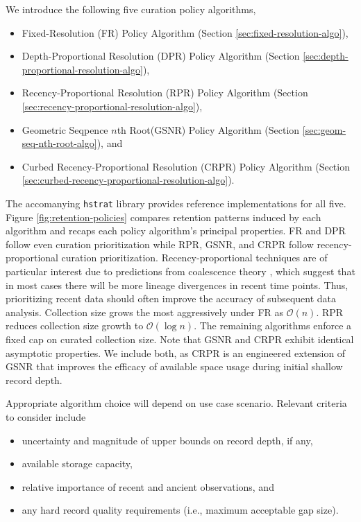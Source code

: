 We introduce the following five curation policy algorithms,
\begin{itemize}
\item Fixed-Resolution (FR) Policy Algorithm (Section \ref{sec:fixed-resolution-algo}),
\item Depth-Proportional Resolution (DPR) Policy Algorithm (Section \ref{sec:depth-proportional-resolution-algo}),
\item Recency-Proportional Resolution (RPR) Policy Algorithm (Section \ref{sec:recency-proportional-resolution-algo}),
\item Geometric Seqpence $n$th Root(GSNR) Policy Algorithm (Section \ref{sec:geom-seq-nth-root-algo}), and
\item Curbed Recency-Proportional Resolution (CRPR) Policy Algorithm (Section \ref{sec:curbed-recency-proportional-resolution-algo}).
\end{itemize}
The accomanying \texttt{hstrat} library provides reference implementations for all five.
Figure \ref{fig:retention-policies} compares retention patterns induced by each algorithm and recaps each policy algorithm's principal properties.
FR and DPR follow even curation prioritization while RPR, GSNR, and CRPR follow recency-proportional curation prioritization.
Recency-proportional techniques are of particular interest due to predictions from coalescence theory \citep{nordborgCoalescentTheory2019, berestyckiRecentProgressCoalescent2009}, which suggest that in most cases there will be more lineage divergences in recent time points.
Thus, prioritizing recent data should often improve the accuracy of subsequent data analysis. 
Collection size grows the most aggressively under FR as $\mathcal{O}(n)$.
RPR reduces collection size growth to $\mathcal{O}(\log n)$.
The remaining algorithms enforce a fixed cap on curated collection size.
Note that GSNR and CRPR exhibit identical asymptotic properties.
We include both, as CRPR is an engineered extension of GSNR that improves the efficacy of available space usage during initial shallow record depth.

Appropriate algorithm choice will depend on use case scenario.
Relevant criteria to consider include
\begin{itemize}
  \item uncertainty and magnitude of upper bounds on record depth, if any,
  \item available storage capacity,
  \item relative importance of recent and ancient observations, and
  \item any hard record quality requirements (i.e., maximum acceptable gap size).
\end{itemize}

